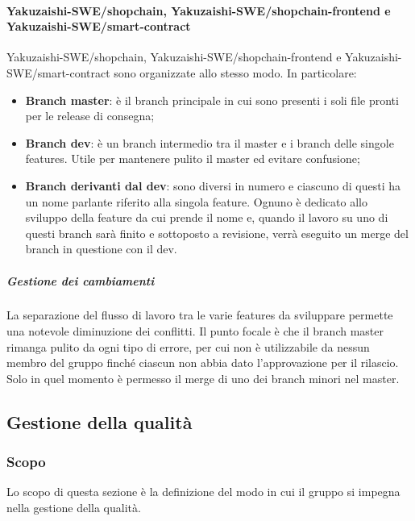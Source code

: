 \paragraph{Yakuzaishi-SWE/shopchain, Yakuzaishi-SWE/shopchain-frontend e
    \\ Yakuzaishi-SWE/smart-contract}
Yakuzaishi-SWE/shopchain, Yakuzaishi-SWE/shopchain-frontend{} e Yakuzaishi-SWE/smart-contract{} sono organizzate allo stesso modo. In particolare:
\begin{itemize}
    \item \textbf{Branch\glo{} master}: è il branch\glo{} principale in cui sono presenti i soli file pronti per le release di consegna;
    \item \textbf{Branch\glo{} dev}: è un branch\glo{} intermedio tra il master e i branch\glo{} delle singole features. Utile per mantenere pulito il master ed evitare confusione;
    \item \textbf{Branch\glo{} derivanti dal dev}: sono diversi in numero e ciascuno di questi ha un nome parlante riferito alla singola feature. Ognuno è dedicato allo sviluppo della feature da cui prende il nome e, quando il lavoro su uno di questi branch\glo{} sarà finito e sottoposto a revisione, verrà eseguito un merge\glo{} del branch\glo{} in questione con il dev.
\end{itemize}

\subparagraph{Gestione dei cambiamenti}
La separazione del flusso di lavoro tra le varie features da sviluppare permette una notevole diminuzione dei conflitti. Il punto focale è che il branch\glo{} master rimanga pulito da ogni tipo di errore, per cui non è utilizzabile da nessun membro del gruppo finché ciascun \roleProjectManagerLow{} non abbia dato l'approvazione per il rilascio. Solo in quel momento è permesso il merge\glo{} di uno dei branch\glo{} minori nel master.

\vspace{2cm}

\subsection{Gestione della qualità}\label{subsection: gestione_qualita}
\subsubsection{Scopo}
Lo scopo di questa sezione è la definizione del modo in cui il gruppo si impegna nella gestione della qualità.
